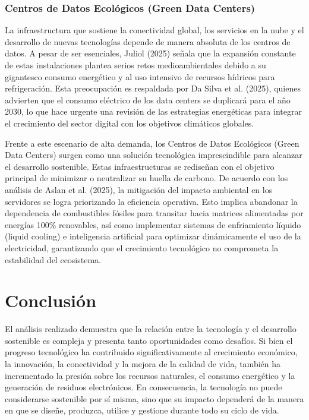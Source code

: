 \documentclass[stu,12pt,a4paper]{apa7}
\begin{document}
    \subsubsection{Centros de Datos Ecológicos (Green Data Centers)}
    La infraestructura que sostiene la conectividad global, los servicios en la nube y el desarrollo de nuevas tecnologías depende de manera absoluta de los centros de datos. A pesar de ser esenciales, Juliol (2025) señala que la expansión constante de estas instalaciones plantea serios retos medioambientales debido a su gigantesco consumo energético y al uso intensivo de recursos hídricos para refrigeración. Esta preocupación es respaldada por Da Silva et al. (2025), quienes advierten que el consumo eléctrico de los data centers se duplicará para el año 2030, lo que hace urgente una revisión de las estrategias energéticas para integrar el crecimiento del sector digital con los objetivos climáticos globales.
    
Frente a este escenario de alta demanda, los Centros de Datos Ecológicos (Green Data Centers) surgen como una solución tecnológica imprescindible para alcanzar el desarrollo sostenible. Estas infraestructuras se rediseñan con el objetivo principal de minimizar o neutralizar su huella de carbono. De acuerdo con los análisis de Aslan et al. (2025), la mitigación del impacto ambiental en los servidores se logra priorizando la eficiencia operativa. Esto implica abandonar la dependencia de combustibles fósiles para transitar hacia matrices alimentadas por energías 100\% renovables, así como implementar sistemas de enfriamiento líquido (liquid cooling) e inteligencia artificial para optimizar dinámicamente el uso de la electricidad, garantizando que el crecimiento tecnológico no comprometa la estabilidad del ecosistema.

    \section{Conclusión}
El análisis realizado demuestra que la relación entre la tecnología y el desarrollo sostenible es compleja y presenta tanto oportunidades como desafíos. Si bien el progreso tecnológico ha contribuido significativamente al crecimiento económico, la innovación, la conectividad y la mejora de la calidad de vida, también ha incrementado la presión sobre los recursos naturales, el consumo energético y la generación de residuos electrónicos. En consecuencia, la tecnología no puede considerarse sostenible por sí misma, sino que su impacto dependerá de la manera en que se diseñe, produzca, utilice y gestione durante todo su ciclo de vida. 
\end{document}
